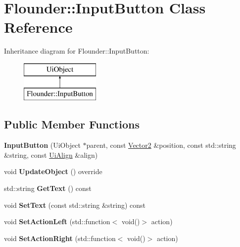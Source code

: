 \hypertarget{class_flounder_1_1_input_button}{}\section{Flounder\+:\+:Input\+Button Class Reference}
\label{class_flounder_1_1_input_button}
Inheritance diagram for Flounder\+:\+:Input\+Button\+:\begin{figure}[H]
\begin{center}
\leavevmode
\includegraphics[height=2.000000cm]{class_flounder_1_1_input_button}
\end{center}
\end{figure}
\subsection*{Public Member Functions}
\begin{DoxyCompactItemize}
\item 
\mbox{\label{class_flounder_1_1_input_button_a985d12243d4e2dcfe50edc323f5ecc56}} 
{\bfseries Input\+Button} (Ui\+Object $\ast$parent, const \hyperlink{class_flounder_1_1_vector2}{Vector2} \&position, const std\+::string \&string, const \hyperlink{namespace_flounder_a561db2012ae4152be62bcd882407d361}{Ui\+Align} \&align)
\item 
\mbox{\label{class_flounder_1_1_input_button_adba2df5b54d8df67d5821abed5e11114}} 
void {\bfseries Update\+Object} () override
\item 
\mbox{\label{class_flounder_1_1_input_button_ac0812422ca090f3be0c688a1f4254f85}} 
std\+::string {\bfseries Get\+Text} () const
\item 
\mbox{\label{class_flounder_1_1_input_button_a7384ba7de76b4956c45f77e13eb79986}} 
void {\bfseries Set\+Text} (const std\+::string \&string) const
\item 
\mbox{\label{class_flounder_1_1_input_button_a25f7eb3c9a6f4df67a1697457b5cfc4d}} 
void {\bfseries Set\+Action\+Left} (std\+::function$<$ void()$>$ action)
\item 
\mbox{\label{class_flounder_1_1_input_button_af3f9dd2e25a4cfc906545791aac3f4fc}} 
void {\bfseries Set\+Action\+Right} (std\+::function$<$ void()$>$ action)
\end{DoxyCompactItemize}
